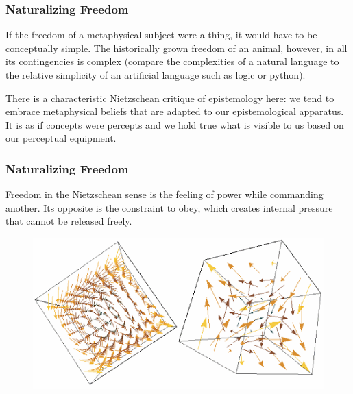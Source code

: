 \documentclass[xcolor=dvipsnames]{beamer}
\begin{document}
\begin{frame}
  \frametitle{Naturalizing Freedom}
If the freedom of a metaphysical subject were a thing, it would have
to be conceptually simple. The historically grown freedom of an
animal, however, in all its contingencies is complex (compare the
complexities of a natural language to the relative simplicity of an
artificial language such as logic or python).

\bigskip

There is a characteristic Nietzschean critique of epistemology here:
we tend to embrace metaphysical beliefs that are adapted to our
epistemological apparatus. It is as if concepts were percepts and we
hold true what is visible to us based on our perceptual equipment.
\end{frame}

\begin{frame}
  \frametitle{Naturalizing Freedom}
  Freedom in the Nietzschean sense is the feeling of power while
  commanding another. Its opposite is the constraint to obey, which
  creates internal pressure that cannot be released freely.
    \begin{figure}[h]
    \includegraphics[scale=0.75]{./3D-vector-field.png}
  \end{figure}
\end{frame}
\end{document}
